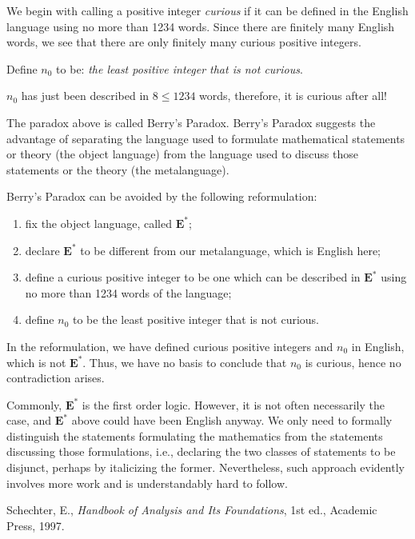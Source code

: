\documentclass[12pt]{article}
\begin{document}
We begin with calling a positive integer \emph{curious} if it can be defined
in the English language using no more than 1234 words. Since there
are finitely many English words, we see that there are only finitely
many curious positive integers.

Define $n_0$ to be: \emph{the least positive integer that is not
curious}.

$n_0$ has just been described in $8\leq 1234$ words, therefore, it
is curious after all!

The paradox above is called Berry's Paradox. Berry's 
Paradox suggests the advantage of separating the language used to formulate 
mathematical statements or theory (the object language) from the language 
used to discuss those statements or the theory (the metalanguage).

Berry's Paradox can be avoided by the following reformulation:

\begin{enumerate}
    \item fix the object language, called $\mathbf{E^\ast}$;
    \item declare $\mathbf{E^\ast}$ to be different from our
    metalanguage, which is English here;
    \item define a curious positive integer to be one which can be
    described in $\mathbf{E^\ast}$ using no more than 1234 words of the
    language;
    \item define $n_0$ to be the least positive integer that is not
    curious.
\end{enumerate}

In the reformulation, we have defined curious positive integers and
$n_0$ in English, which is not $\mathbf{E^\ast}$. Thus, we have no
basis to conclude that $n_0$ is curious, hence no contradiction
arises.

Commonly, $\mathbf{E^\ast}$ is the first order logic. However, it is
not often necessarily the case, and $\mathbf{E^\ast}$ above could
have been English anyway. We only need to formally distinguish the
statements formulating the mathematics from the statements
discussing those formulations, i.e., declaring the two classes of
statements to be disjunct, perhaps by italicizing the former.
Nevertheless, such approach evidently involves more work and is
understandably hard to follow.

\begin{thebibliography}{1}
Schechter, E., \emph{Handbook of Analysis and Its Foundations}, 1st ed., Academic Press, 1997.
\end{thebibliography}
\end{document}
